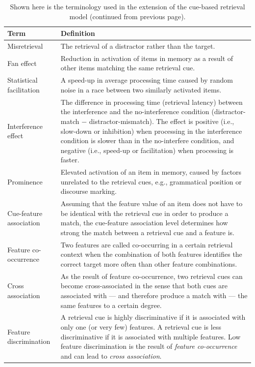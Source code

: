 \documentclass{cambridge7A}\usepackage[]{graphicx}\usepackage[]{color}
\begin{document}
\begin{subappendices}
\begin{table}[!htbp]
\begin{center}
{\footnotesize
\begin{tabular}{p{4cm}p{6cm}}
\hline
Term                & Definition \\
\hline
Misretrieval        & The retrieval of a distractor rather than the target. \\
Fan effect          & Reduction in activation of items in memory as a result of other items matching the same retrieval cue. \\
Statistical facilitation & A speed-up in average processing time caused by random noise in a race between two similarly activated items. \\
Interference effect  & The difference in processing time (retrieval latency) between the interference and the no-interference condition (distractor-match $-$ distractor-mismatch). The effect is positive (i.e., slow-down or inhibition) when processing in the interference condition is slower than in the no-interfere condition, and negative (i.e., speed-up or facilitation) when processing is faster. \\
Prominence          & Elevated activation of an item in memory, caused by factors unrelated to the retrieval cues, e.g., grammatical position or discourse marking. \\
Cue-feature association         & Assuming that the feature value of an item does not have to be identical with the retrieval cue in order to produce a match, the cue-feature association level determines how strong the match between a retrieval cue and a feature is.  \\
Feature co-occurrence  			& Two features are called co-occurring in a certain retrieval context when the combination of both features identifies the correct target more often than other feature combinations. \\
Cross association          & As the result of feature co-occurrence, two retrieval cues can become cross-associated in the sense that both cues are associated with --- and therefore produce a match with --- the same features to a certain degree. \\
Feature discrimination  & A retrieval cue is highly discriminative if it is associated with only one (or very few) features. A retrieval cue is less discriminative if it is associated with multiple features. Low feature discrimination is the result of \emph{feature co-occurrence} and can lead to \emph{cross association}. \\
\hline
\end{tabular}
}
\caption{Shown here is the terminology used in the extension of the cue-based retrieval model (continued from previous page).}\label{tab:definitionsEXT2}
\end{center}
\end{table}



\end{subappendices}
\end{document}
